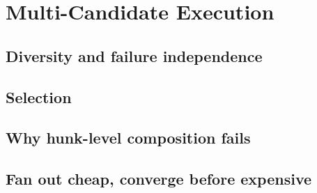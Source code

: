 \section{Multi-Candidate Execution}
\label{sec:candidates}


\subsection{Diversity and failure independence}

\subsection{Selection}

\subsection{Why hunk-level composition fails}

\subsection{Fan out cheap, converge before expensive}
